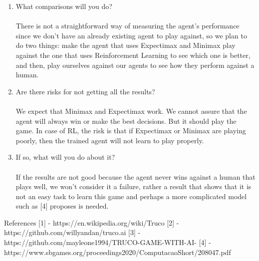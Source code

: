 \documentclass{article}
\begin{document}
\begin{enumerate}
\item What comparisons will you do?
\\\\
There is not a straightforward way of measuring the agent’s performance since we don’t have an already existing agent to play against, so we plan to do two things: make the agent that uses Expectimax and Minimax play against the one that uses Reinforcement Learning to see which one is better, and then, play ourselves against our agents to see how they perform against a human.
\item Are there risks for not getting all the results?
\\\\ 
We expect that Minimax and Expectimax work. We cannot assure that the agent will always win or make the best decisions. But it should play the game. In case of RL, the risk is that if Expectimax or Minimax are playing poorly, then the trained agent will not learn to play properly.    
    
\item If so, what will you do about it?
\\\\	
If the results are not good because the agent never wins against a human that plays well, we won’t consider it a failure, rather a result that shows that it is not an easy task to learn this game and perhaps a more complicated model such as [4] proposes is needed.

\end{enumerate}


References
[1] -  https://en.wikipedia.org/wiki/Truco
[2] - https://github.com/willyandan/truco.ai
[3] - https://github.com/mayleone1994/TRUCO-GAME-WITH-AI-
[4] - https://www.sbgames.org/proceedings2020/ComputacaoShort/208047.pdf        
\end{document}
